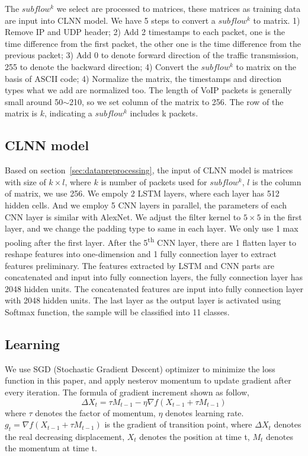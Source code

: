 \documentclass[conference]{IEEEtran}
\begin{document}
The $subflow^k$ we select are processed to matrices, these matrices as training data are input into CLNN model. We have 5 steps to convert a $subflow^k$ to matrix. 1) Remove IP and UDP header; 2) Add 2 timestamps to each packet, one is the time difference from the first packet, the other one is the time difference from the previous packet; 3) Add 0 to denote forward direction of the traffic transmission, 255 to denote the backward direction; 4) Convert the $subflow^k$ to matrix on the basis of ASCII code; 4) Normalize the matrix, the timestamps and direction types what we add are normalized too. The length of VoIP packets is generally small around 50$\sim$210, so we set column of the matrix to 256. The row of the matrix is $k$, indicating a $subflow^k$ includes k packets.

\subsection{CLNN model}
Based on section~\ref{sec:datapreprocessing}, the input of CLNN model is matrices with size of $k \times l$, where $k$ is number of packets used for $subflow^k$, $l$ is the column of matrix, we use 256. We empoly 2 LSTM layers, where each layer has 512 hidden cells. And we employ 5 CNN layers in parallel, the parameters of each CNN layer is similar with AlexNet. We adjust the filter kernel to $5 \times 5$ in the first layer, and we change the padding type to same in each layer. We only use 1 max pooling after the first layer. After the 5\textsuperscript{th} CNN layer, there are 1 flatten layer to reshape features into one-dimension and 1 fully connection layer to extract features preliminary. The features extracted by LSTM and CNN parts are concatenated and input into fully connection layers, the fully connection layer has 2048 hidden units. The concatenated features are input into fully connection layer with 2048 hidden units. The last layer as the output layer is activated using Softmax function, the sample will be classified into 11 classes.

\subsection{Learning}
We use SGD (Stochastic Gradient Descent) optimizer to minimize the loss function in this paper, and apply nesterov momentum to update gradient after every iteration. The formula of gradient increment shown as follow,
\begin{equation}
\Delta {X_t} = \tau {M_{t - 1}} - \eta \nabla f({X_{t - 1}} + \tau {M_{t - 1}})
\end{equation}
where ${\tau}$ denotes the factor of momentum, ${\eta}$ denotes learning rate. ${g_t} = \nabla f({X_{t - 1}} + \tau {M_{t - 1}})$ is the gradient of transition point, where $\Delta {X_t}$ denotes the real decreasing displacement, ${X_t}$ denotes the position at time t, ${M_t}$ denotes the momentum at time t.
\end{document}
